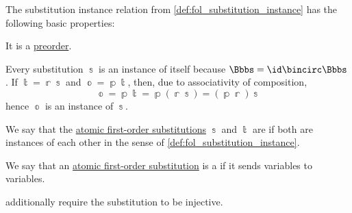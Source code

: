 \begin{proposition}\label{thm:def:fol_substitution_instance}
  The substitution instance relation from \cref{def:fol_substitution_instance} has the following basic properties:
  \begin{thmenum}
     It is a \hyperref[def:preordered_set]{preorder}.
  \end{thmenum}
\end{proposition}
\begin{comments}
   Every substitution \( \Bbbs \) is an instance of itself because \( \Bbbs = \id \bincirc \Bbbs \).
   If \( \Bbbt = \Bbbr\Bbbs \) and \( \Bbbo = \Bbbp\Bbbt \), then, due to associativity of composition,
  \begin{equation*}
    \Bbbo
    =
    \Bbbp\Bbbt
    =
    \Bbbp(\Bbbr\Bbbs)
    =
    (\Bbbp\Bbbr)\Bbbs
  \end{equation*}
  hence \( \Bbbo \) is an instance of \( \Bbbs \).
\end{comments}

\begin{definition}\label{def:fol_substitution_equivalence}\mimprovised
  We say that the \hyperref[def:atomic_fol_substitution]{atomic first-order substitutions} \( \Bbbs \) and \( \Bbbt \) are  if both are instances of each other in the sense of \cref{def:fol_substitution_instance}.
\end{definition}

\begin{definition}\label{def:fol_renaming_substitution}
  We say that an \hyperref[def:atomic_fol_substitution]{atomic first-order substitution} is a  if it sends variables to variables.
\end{definition}
\begin{comments}
  \item {} additionally require the substitution to be injective.
\end{comments}


